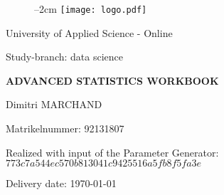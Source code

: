 
\label{titlePage}
\begin{figure}[h]
\centering
\advance\leftskip--2cm
\texttt{[image: logo.pdf]}
\end{figure}
\FloatBarrier


\vspace*{5mm}

\begin{large} 
\begin{center}
University of Applied Science - Online
\end{center}
\end{large} 

\begin{large} 
\begin{center}
Study-branch: data science
\end{center}
\end{large}

\vspace*{15mm}

\begin{Large} 
\begin{center}
\textbf{ADVANCED STATISTICS WORKBOOK}
\end{center}
\end{Large}

\vspace*{15mm}

\begin{large} 
\begin{center}
Dimitri MARCHAND
\end{center}
\end{large} 

\vspace*{-6mm}

\begin{large} 
\begin{center}
Matrikelnummer: 92131807
\end{center}
\end{large} 





\begin{large} 
\begin{center}
Realized with input of the Parameter Generator: $773c7a544ec570b813041c9425516a5fb8f5fa3e$
\end{center}
\end{large} 



\vspace*{-6mm}

\begin{large} 
\begin{center}
Delivery date: \today
\end{center}
\end{large} 


\pagestyle{empty} %

